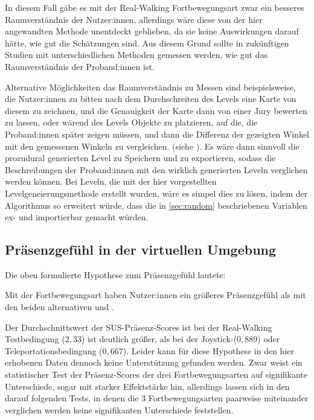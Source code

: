             In diesem Fall gäbe es mit der Real-Walking Fortbewegungsart zwar ein besseres Raumverständnis der Nutzer:innen, allerdings wäre diese von der hier angewandten Methode unentdeckt geblieben, da sie keine Auswirkungen darauf hätte, wie gut die Schätzungen sind. Aus diesem Grund sollte in zukünftigen Studien mit unterschiedlichen Methoden gemessen werden, wie gut das Raumverständnis der Proband:innen ist.

            Alternative Möglichkeiten das Raumverständnis zu Messen sind beispielsweise, die Nutzer:innen zu bitten nach dem Durchschreiten des Levels eine Karte von diesem zu zeichnen, und die Genauigkeit der Karte dann von einer Jury bewerten zu lassen, oder wärend des Levels Objekte zu platzieren, auf die, die Proband:innen später zeigen müssen, und dann die Differenz der gezeigten Winkel mit den gemessenen Winkeln zu vergleichen. (siehe \cite{peck-vergleich-2011, langbehn-vergleich-2018}). Es wäre dann sinnvoll die prozudural generierten Level zu Speichern und zu exportieren, sodass die Beschreibungen der Proband:innen mit den wirklich generierten Leveln verglichen werden können. Bei Leveln, die mit der hier vorgestellten Levelgeneierungsmethode erstellt wurden, wäre es simpel dies zu lösen, indem der Algorithmus so erweitert würde, dass die in \autoref{sec:random} beschriebenen Variablen ex- und importierbar gemacht würden.

        \subsection{Präsenzgefühl in der virtuellen Umgebung}
            Die oben formulierte Hypothese zum Präsenzgefühl lautete:

            Mit der  Fortbewegungsart haben Nutzer:innen ein größeres Präsenzgefühl als mit den beiden alternativen  und .

            Der Durchschnittswert der SUS-Präsenz-Scores ist bei der Real-Walking Testbedingung ($2,33$) ist deutlich größer, als bei der Joystick-($0,889$) oder Teleportationsbedingung ($0,667$).
            Leider kann für diese Hypothese in den hier erhobenen Daten dennoch keine Unterstützung gefunden werden. Zwar weist ein statistischer Test der Präsenz-Scores der drei Fortbewegungsarten auf signifikante Unterschiede, sogar mit starker Effektstärke hin, allerdings lassen sich in den darauf folgenden Tests, in denen die 3 Fortbewegungsarten paarweise miteinander verglichen werden keine signifikanten Unterschiede feststellen.

